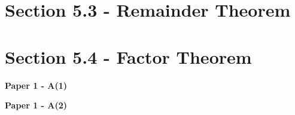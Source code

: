 \documentclass[12pt, a4paper]{article}
\begin{document}
\section*{Section 5.3 - Remainder Theorem}\label{section:4-5-3}





\section*{Section 5.4 - Factor Theorem}\label{section:4-5-4}

\textbf{Paper 1 - A(1)}
\begin{enumx}[label=\arabic*.,start=3]
\item {}\label{DSE2014-CoreP1-Q07} 
\end{enumx}
\textbf{Paper 1 - A(2)}
\begin{enumx}[label=\arabic*.,start=4]
\item {}\label{DSE2012P-CoreP1-Q10} 
\item {}\label{DSE2015-CoreP1-Q11} 
\item {}\label{DSE2016-CoreP1-Q14} 
\item {}\label{DSE2017-CoreP1-Q14} 
\item {}\label{DSE2018-CoreP1-Q12} 
\item {}\label{DSE2019-CoreP1-Q11} 
\item {}\label{DSE2020-CoreP1-Q13} 
\item {}\label{DSE2021-CoreP1-Q12} 
\item {}\label{DSE2022-CoreP1-Q14} 
\item {}\label{DSE2023-CoreP1-Q13} 
\item {}\label{DSE2024-CoreP1-Q14} 
\end{enumx}
\end{document}
